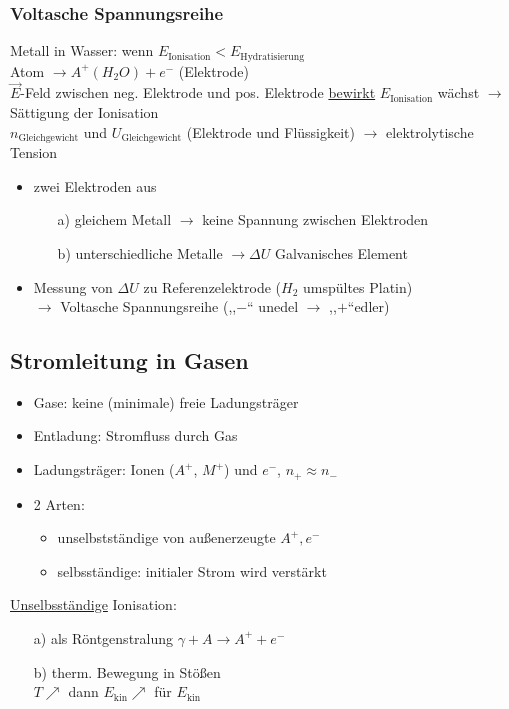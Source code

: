 \documentclass[titlepage,12pt,a4paper,ngerman]{report}
\newcommand{\tx}[1]{\textrm{#1}}
\begin{document}
\subsubsection{Voltasche Spannungsreihe}
Metall in Wasser: wenn $ E_{\tx{Ionisation}} < E_{\tx{Hydratisierung}} $\\
Atom $ \rightarrow A^+(H_2O) + e^-$ (Elektrode)\\
$ \vec{E} $-Feld zwischen neg. Elektrode und pos. Elektrode \underline{bewirkt} $ E_{\tx{Ionisation}} $ wächst $ \rightarrow$ Sättigung der Ionisation \\
$ n_{\tx{Gleichgewicht}} $ und $ U_{\tx{Gleichgewicht}} $ (Elektrode und Flüssigkeit) $ \rightarrow $ elektrolytische Tension
\begin{itemize}
	\item zwei Elektroden aus
	\begin{itemize}
		\item[a)] gleichem Metall $ \rightarrow $ keine Spannung zwischen Elektroden
		\item[b)] unterschiedliche Metalle $ \rightarrow \Delta U $ Galvanisches Element
	\end{itemize}
	\item Messung von $ \Delta U $ zu Referenzelektrode ($ H_2 $ umspültes Platin)\\
	$ \rightarrow $ Voltasche Spannungsreihe (,,$-$`` unedel $ \rightarrow $ ,,$+$``edler)
\end{itemize}

\subsection{Stromleitung in Gasen}
\begin{itemize}
	\item Gase: keine (minimale) freie Ladungsträger
	\item Entladung: Stromfluss durch Gas
	\item Ladungsträger: Ionen ($ A^+ $, $ M^+ $) und $ e^- $, $ n_+ \approx n_- $
	\item 2 Arten: 
	\begin{itemize}
		\item unselbstständige von außenerzeugte $ A^+,e^- $
		\item selbsständige: initialer Strom wird verstärkt
	\end{itemize}
\end{itemize}
\underline{Unselbsständige}
Ionisation: \begin{itemize}
	\item[a)] als Röntgenstralung $ \gamma + A \rightarrow A^+ + e^- $
	\item[b)] therm. Bewegung in Stößen\\
	$ T \nearrow $ dann $ E_{\tx{kin}} \nearrow $ für $ E_{\tx{kin}}   $
\end{itemize}
\end{document}
